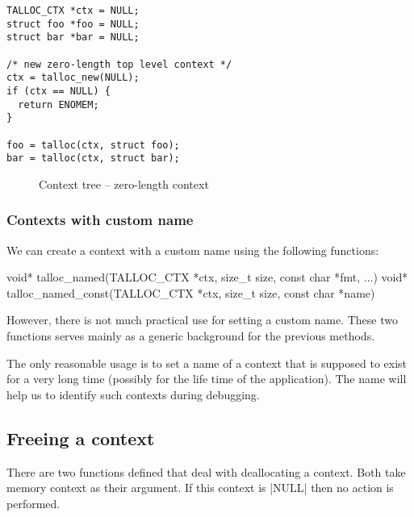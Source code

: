 \begin{lstlisting}[caption={talloc_new()},label=lst:talloc_new]
TALLOC_CTX *ctx = NULL;
struct foo *foo = NULL;
struct bar *bar = NULL;

/* new zero-length top level context */
ctx = talloc_new(NULL);
if (ctx == NULL) {
  return ENOMEM;
}

foo = talloc(ctx, struct foo);
bar = talloc(ctx, struct bar);
\end{lstlisting}

\begin{figure}[H]
  \centering
  
  \caption{Context tree -- zero-length context}
  \label{fig:context-tree-talloc-new}
\end{figure}

\subsubsection{Contexts with custom name}

We can create a context with a custom name using the following functions:
\begin{funcproto}
void* talloc_named(TALLOC_CTX *ctx, size_t size,
                   const char *fmt, ...)
void* talloc_named_const(TALLOC_CTX *ctx, size_t size,
                         const char *name)
\end{funcproto}
\funclistend
However, there is not much practical use for setting a custom name. These two
functions serves mainly as a generic background for the previous methods.

The only reasonable usage is to set a name of a context that is supposed to
exist for a very long time (possibly for the life time of the application). The
name will help us to identify such contexts during debugging.

\subsection{Freeing a context}
\label{talloc:subsec:free-context}

There are two functions defined that deal with deallocating a context. Both
take memory context as their argument. If this context is |NULL| then no action
is performed.


